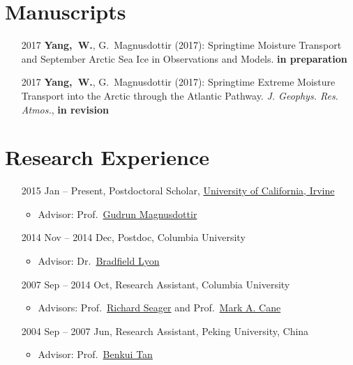 \documentclass[11pt]{article}
\newcommand{\uci}{\href{http://www.uci.edu}{University of California, Irvine}}
\newcommand{\benkui}{\href{http://www.phy.pku.edu.cn/personnel/das/bktan.xml}{Benkui Tan}}
\newcommand{\richard}{\href{http://www.ldeo.columbia.edu/res/div/ocp/people/seager/}{Richard Seager}}
\newcommand{\cane}{\href{http://www.ldeo.columbia.edu/user/mcane}{Mark A. Cane}}
\newcommand{\brad}{\href{http://climatechange.umaine.edu/people/profile/bradfield_lyon}
{Bradfield Lyon}}
\newcommand{\gudrun}{\href{http://sites.uci.edu/magnusdottir}{Gudrun Magnusdottir}}
\begin{document}
\section{Manuscripts}
\begin{itemize}[leftmargin=10ex, itemsep=1ex]
	\item[2017] \textbf{Yang,~W.}, G.~Magnusdottir (2017): Springtime Moisture Transport and September Arctic Sea Ice in Observations and Models. \textbf{in preparation}
	
	\item[2017] \textbf{Yang,~W.}, G.~Magnusdottir (2017): Springtime Extreme Moisture Transport into the Arctic through the Atlantic Pathway. \emph{J. Geophys. Res. Atmos.}, \textbf{in revision}
\end{itemize}


\section{Research Experience}
\begin{itemize}[leftmargin=10ex, itemsep=1ex]
	\item[2015]Jan -- Present, Postdoctoral Scholar, \uci{}
	\begin{itemize}[leftmargin=0ex]
		\item  Advisor: Prof.~\gudrun{}
		\end{itemize}
	\item[2014]Nov -- 2014 Dec, Postdoc, Columbia University
	\begin{itemize}[leftmargin=0ex]
		\item  Advisor: Dr.~\brad{}
		\end{itemize}
	\item[2007] Sep -- 2014 Oct,  Research  Assistant, Columbia University
	\begin{itemize}[leftmargin=0ex]
		\item  Advisors: Prof.~\richard{} and Prof.~\cane{}
		\end{itemize}
	\item[2004] Sep -- 2007 Jun, Research  Assistant, Peking University, China
	\begin{itemize}[leftmargin=0ex]
		\item  Advisor: Prof.~\benkui{}
		\end{itemize}
	\end{itemize}
\end{document}
